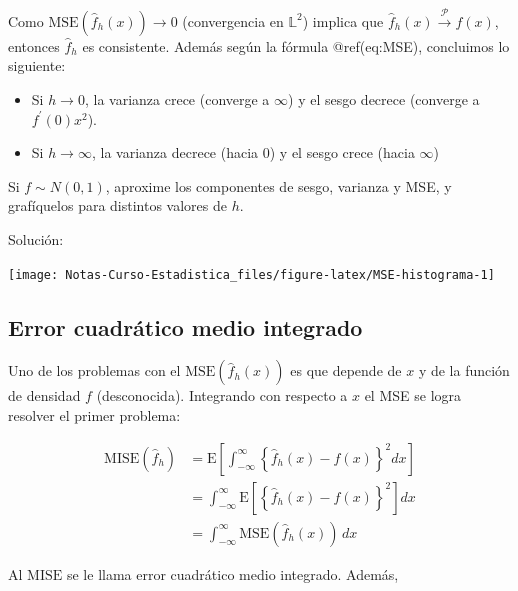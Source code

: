 \documentclass[
  12pt,
]{book}
\providecommand{\tightlist}{%
  \setlength{\itemsep}{0pt}\setlength{\parskip}{0pt}}
\begin{document}
Como \(\mathrm{MSE}\left( \hat{f}_h(x)\right) \to 0\) (convergencia en
\(\mathbb{L}^2\)) implica que
\(\hat{f}_h(x) \stackrel{\mathcal{P}}{\to} f(x)\), entonces
\(\hat{f}_h\) es consistente. Además según la fórmula @ref(eq:MSE),
concluimos lo siguiente:

\begin{itemize}
\tightlist
\item
  Si \(h\to 0\), la varianza crece (converge a \(\infty\)) y el sesgo
  decrece (converge a \(f^\prime (0)x^2\)).
\item
  Si \(h\to \infty\), la varianza decrece (hacia 0) y el sesgo crece
  (hacia \(\infty\))
\end{itemize}

\leavevmode{}%
Si \(f\sim N(0,1)\), aproxime los componentes de sesgo, varianza y MSE,
y grafíquelos para distintos valores de \(h\).

Solución:

\begin{center}\texttt{[image: Notas-Curso-Estadistica\_files/figure-latex/MSE-histograma-1]} \end{center}

\hypertarget{error-cuadruxe1tico-medio-integrado}{%
\subsection{Error cuadrático medio
integrado}\label{error-cuadruxe1tico-medio-integrado}}

Uno de los problemas con el \(\mathrm{MSE}\left( \hat{f}_h(x)\right)\)
es que depende de \(x\) y de la función de densidad \(f\) (desconocida).
Integrando con respecto a \(x\) el MSE se logra resolver el primer
problema:

\begin{align*}
\mathrm{MISE}\left(  \hat{f}_h\right)
& = \mathrm{E}\left[
\int_{ -\infty}^{\infty} \left\{
\hat{f}_h(x) - f(x)
\right\}^2 dx
\right]                                                       \\
& = \int_{ -\infty}^{\infty} \mathrm{E}\left[
\left\{
\hat{f}_h(x) - f(x)
\right\}^2
\right] dx                                                    \\
& = \int_{ -\infty}^{\infty}\mathrm{MSE}(\hat{f}_h(x)) \, dx
\end{align*}

Al \(\mathrm{MISE}\) se le llama error cuadrático medio integrado.
Además,
\end{document}
